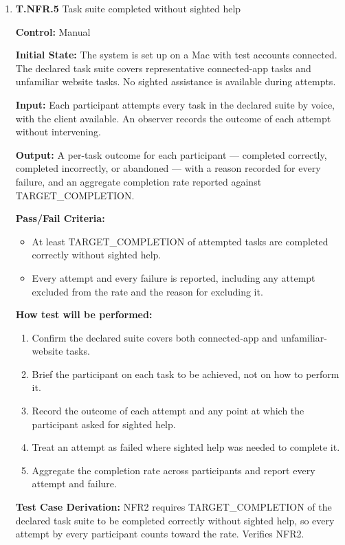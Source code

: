 \documentclass[12pt, titlepage]{article}
\begin{document}
\begin{enumerate}


\item{\textbf{T.NFR.5} Task suite completed without sighted help\\}\label{test:T.NFR.5}

\textbf{Control:} Manual

\textbf{Initial State:} The system is set up on a Mac with test accounts connected. The declared task suite
covers representative connected-app tasks and unfamiliar website tasks. No sighted assistance is available
during attempts.

\textbf{Input:} Each participant attempts every task in the declared suite by voice, with the client
available. An observer records the outcome of each attempt without intervening.

\textbf{Output:} A per-task outcome for each participant --- completed correctly, completed incorrectly,
or abandoned --- with a reason recorded for every failure, and an aggregate completion rate reported against
TARGET\_COMPLETION.

\textbf{Pass/Fail Criteria:}
\begin{itemize}
  \item At least TARGET\_COMPLETION of attempted tasks are completed correctly without sighted help.
  \item Every attempt and every failure is reported, including any attempt excluded from the rate and the reason for excluding it.
\end{itemize}

\textbf{How test will be performed:}

\begin{enumerate}
  \item Confirm the declared suite covers both connected-app and unfamiliar-website tasks.
  \item Brief the participant on each task to be achieved, not on how to perform it.
  \item Record the outcome of each attempt and any point at which the participant asked for sighted help.
  \item Treat an attempt as failed where sighted help was needed to complete it.
  \item Aggregate the completion rate across participants and report every attempt and failure.
\end{enumerate}

\textbf{Test Case Derivation:} NFR2 requires TARGET\_COMPLETION of the declared task suite to be completed correctly without sighted help, so every attempt by every participant counts toward the rate. Verifies NFR2.


\end{enumerate}
\end{document}
